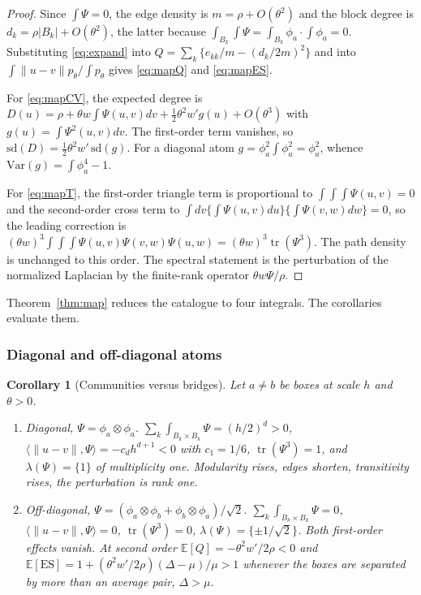 \documentclass[11pt]{article}
\newtheorem{corollary}[theorem]{Corollary}
\theoremstyle{definition}
\newcommand{\1}{\mathbf 1}\newcommand{\op}{\operatorname}
\begin{document}
\begin{proof}
Since $\int\Psi=0$, the edge density is $m=\rho+O(\theta^{2})$ and the block
degree is $d_k=\rho|B_k|+O(\theta^{2})$, the latter because
$\int_{B_k}\!\int\Psi=\int_{B_k}\phi_a\cdot\int\phi_a=0$.  Substituting
\eqref{eq:expand} into $Q=\sum_k\{e_{kk}/m-(d_k/2m)^{2}\}$ and into
$\int\|u-v\|p_\theta/\int p_\theta$ gives \eqref{eq:mapQ} and \eqref{eq:mapES}.

For \eqref{eq:mapCV}, the expected degree is
$D(u)=\rho+\theta w\!\int\!\Psi(u,v)dv+\tfrac12\theta^{2}w'g(u)+O(\theta^{3})$
with $g(u)=\int\Psi^{2}(u,v)dv$.  The first-order term vanishes, so
$\mathrm{sd}(D)=\tfrac12\theta^{2}w'\,\mathrm{sd}(g)$.  For a diagonal atom
$g=\phi_a^{2}\int\phi_a^{2}=\phi_a^{2}$, whence
$\mathrm{Var}(g)=\int\phi_a^{4}-1$.

For \eqref{eq:mapT}, the first-order triangle term is proportional to
$\int\!\int\!\int\Psi(u,v)=0$ and the second-order cross term to
$\int dv\{\int\Psi(u,v)du\}\{\int\Psi(v,w)dw\}=0$, so the leading correction is
$(\theta w)^{3}\int\!\int\!\int\Psi(u,v)\Psi(v,w)\Psi(u,w)=(\theta w)^{3}\operatorname{tr}(\Psi^{3})$.
The path density is unchanged to this order.  The spectral statement is the
perturbation of the normalized Laplacian by the finite-rank operator
$\theta w\Psi/\rho$.
\end{proof}

Theorem~\ref{thm:map} reduces the catalogue to four integrals.  The corollaries
evaluate them.

\subsubsection{Diagonal and off-diagonal atoms}

\begin{corollary}[Communities versus bridges]                \label{cor:diag}
Let $a\ne b$ be boxes at scale $h$ and $\theta>0$.
\begin{enumerate}[label=\textup{(\roman*)},leftmargin=*]
\item \emph{Diagonal, $\Psi=\phi_a\otimes\phi_a$.}
$\sum_k\int_{B_k\times B_k}\Psi=(h/2)^{d}>0$,
$\langle\|u-v\|,\Psi\rangle=-c_dh^{d+1}<0$ with $c_1=1/6$,
$\operatorname{tr}(\Psi^{3})=1$, and $\lambda(\Psi)=\{1\}$ of multiplicity one.
Modularity rises, edges shorten, transitivity rises, the perturbation is rank
one.
\item \emph{Off-diagonal, $\Psi=(\phi_a\otimes\phi_b+\phi_b\otimes\phi_a)/\sqrt2$.}
$\sum_k\int_{B_k\times B_k}\Psi=0$, $\langle\|u-v\|,\Psi\rangle=0$,
$\operatorname{tr}(\Psi^{3})=0$, $\lambda(\Psi)=\{\pm1/\sqrt2\}$.  Both
first-order effects vanish.  At second order
$\mathbb E[Q]=-\theta^{2}w'/2\rho<0$ and
$\mathbb E[\mathrm{ES}]=1+(\theta^{2}w'/2\rho)(\Delta-\mu)/\mu>1$ whenever the
boxes are separated by more than an average pair, $\Delta>\mu$.
\end{enumerate}
\end{corollary}
\end{document}
